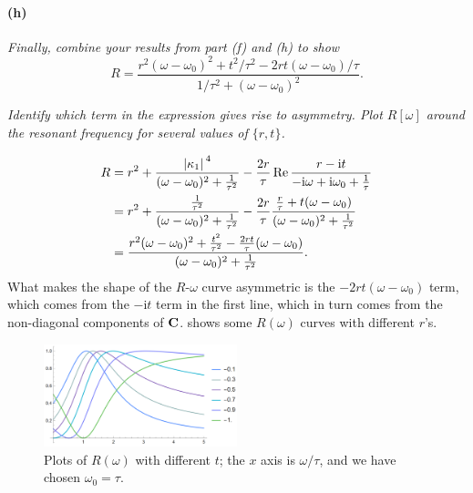 \documentclass[hyperref, a4paper]{article}
\newcommand*{\ii}{\mathrm{i}}
\begin{document}
\paragraph*{(h)} \textit{Finally, combine your results from part (f) and (h) to show
$$
R=\frac{r^2\left(\omega-\omega_0\right)^2+t^2 / \tau^2-2 r t\left(\omega-\omega_0\right) / \tau}{1 / \tau^2+\left(\omega-\omega_0\right)^2} .
$$
}

\textit{Identify which term in the expression gives rise to asymmetry. Plot $R[\omega]$ around the resonant frequency for several values of $\{r, t\}$.}

\begin{equation}
    \begin{aligned}
        R &= r^2 + \frac{\abs*{\kappa_1}^4}{(\omega - \omega_0)^2 + \frac{1}{\tau^2}}
        - \frac{2 r}{\tau} \Re \frac{r - \ii t}{- \ii \omega + \ii \omega_0 + \frac{1}{\tau}} \\
        &= r^2 + \frac{\frac{1}{\tau^2}}{(\omega - \omega_0)^2 + \frac{1}{\tau^2}}
        - \frac{2 r}{\tau} \frac{\frac{r}{\tau} + t (\omega - \omega_0)}{(\omega - \omega_0)^2 + \frac{1}{\tau^2}} \\
        &= \frac{r^2 (\omega - \omega_0)^2 + \frac{t^2}{\tau^2} - \frac{2 r t}{\tau} (\omega - \omega_0)}{(\omega - \omega_0)^2 + \frac{1}{\tau^2}}.
    \end{aligned}
\end{equation}
What makes the shape of the $R$-$\omega$ curve asymmetric is the $- 2 r t (\omega - \omega_0)$ term, 
which comes from the $- \ii t$ term in the first line, 
which in turn comes from the non-diagonal components of $\vb{C}$.
 shows some $R(\omega)$ curves with different $r$'s.

\begin{figure}
    \centering
    \includegraphics[width=0.5\textwidth]{figs/homework-3-R.png}
    \caption{Plots of $R(\omega)$ with different $t$; the $x$ axis is $\omega / \tau$, 
    and we have chosen $\omega_0 = \tau$.}
    \label{fig:r-plot}
\end{figure}

\section{}
\end{document}
